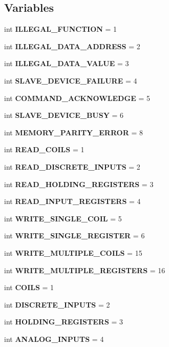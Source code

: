 \subsection*{Variables}
\begin{DoxyCompactItemize}
\item 
int {\bf I\+L\+L\+E\+G\+A\+L\+\_\+\+F\+U\+N\+C\+T\+I\+O\+N} = 1
\item 
int {\bf I\+L\+L\+E\+G\+A\+L\+\_\+\+D\+A\+T\+A\+\_\+\+A\+D\+D\+R\+E\+S\+S} = 2
\item 
int {\bf I\+L\+L\+E\+G\+A\+L\+\_\+\+D\+A\+T\+A\+\_\+\+V\+A\+L\+U\+E} = 3
\item 
int {\bf S\+L\+A\+V\+E\+\_\+\+D\+E\+V\+I\+C\+E\+\_\+\+F\+A\+I\+L\+U\+R\+E} = 4
\item 
int {\bf C\+O\+M\+M\+A\+N\+D\+\_\+\+A\+C\+K\+N\+O\+W\+L\+E\+D\+G\+E} = 5
\item 
int {\bf S\+L\+A\+V\+E\+\_\+\+D\+E\+V\+I\+C\+E\+\_\+\+B\+U\+S\+Y} = 6
\item 
int {\bf M\+E\+M\+O\+R\+Y\+\_\+\+P\+A\+R\+I\+T\+Y\+\_\+\+E\+R\+R\+O\+R} = 8
\item 
int {\bf R\+E\+A\+D\+\_\+\+C\+O\+I\+L\+S} = 1
\item 
int {\bf R\+E\+A\+D\+\_\+\+D\+I\+S\+C\+R\+E\+T\+E\+\_\+\+I\+N\+P\+U\+T\+S} = 2
\item 
int {\bf R\+E\+A\+D\+\_\+\+H\+O\+L\+D\+I\+N\+G\+\_\+\+R\+E\+G\+I\+S\+T\+E\+R\+S} = 3
\item 
int {\bf R\+E\+A\+D\+\_\+\+I\+N\+P\+U\+T\+\_\+\+R\+E\+G\+I\+S\+T\+E\+R\+S} = 4
\item 
int {\bf W\+R\+I\+T\+E\+\_\+\+S\+I\+N\+G\+L\+E\+\_\+\+C\+O\+I\+L} = 5
\item 
int {\bf W\+R\+I\+T\+E\+\_\+\+S\+I\+N\+G\+L\+E\+\_\+\+R\+E\+G\+I\+S\+T\+E\+R} = 6
\item 
int {\bf W\+R\+I\+T\+E\+\_\+\+M\+U\+L\+T\+I\+P\+L\+E\+\_\+\+C\+O\+I\+L\+S} = 15
\item 
int {\bf W\+R\+I\+T\+E\+\_\+\+M\+U\+L\+T\+I\+P\+L\+E\+\_\+\+R\+E\+G\+I\+S\+T\+E\+R\+S} = 16
\item 
int {\bf C\+O\+I\+L\+S} = 1
\item 
int {\bf D\+I\+S\+C\+R\+E\+T\+E\+\_\+\+I\+N\+P\+U\+T\+S} = 2
\item 
int {\bf H\+O\+L\+D\+I\+N\+G\+\_\+\+R\+E\+G\+I\+S\+T\+E\+R\+S} = 3
\item 
int {\bf A\+N\+A\+L\+O\+G\+\_\+\+I\+N\+P\+U\+T\+S} = 4
\end{DoxyCompactItemize}
